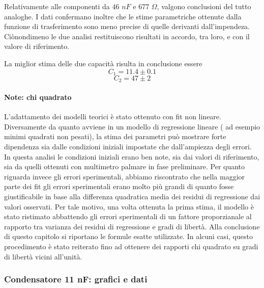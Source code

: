 Relativamente alle componenti da $46$ $nF$ e 677 $\Omega$, valgono conclusioni del tutto analoghe. I dati confermano inoltre che le stime parametriche ottenute dalla funzione di trasferimento sono meno precise di quelle derivanti dall'impendeza. Ciònondimeno le due analisi restituiscono risultati in accordo, tra loro, e con il valore di riferimento.




La miglior stima delle due capacità risulta in conclusione essere
$$
C_{1} = 11.4 \pm 0.1 $$
$$
C_{2} = 47 \pm 2
$$

\paragraph*{Note: chi quadrato}
\label{Note Chi quadrato}

L'adattamento dei modelli teorici è stato ottenuto con fit non lineare. Diversamente da quanto avviene in un modello di regressione lineare ( ad esempio minimi quadrati non pesati), la stima dei parametri può mostrare forte dipendenza sia dalle condizioni iniziali impostate che dall'ampiezza degli errori. In questa analisi le condizioni iniziali erano ben note, sia dai valori di riferimento, sia da quelli ottenuti con multimetro palmare in fase preliminare. Per quanto riguarda invece gli errori sperimentali, abbiamo riscontrato che nella maggior parte dei fit gli errori sperimentali erano molto più grandi di quanto fosse giustificabile in base alla differenza quadratica media dei residui di regressione dai valori osservati. Per tale motivo, una volta ottenuta la prima stima, il modello è stato ristimato abbattendo gli errori sperimentali di un fattore proporzianale al rapporto tra varianza dei residui di regressione e gradi di libertà. Alla conclusione di questo capitolo si riportano le formule esatte utilizzate. In alcuni casi, questo procedimento è stato reiterato fino ad ottenere dei rapporti chi quadrato su gradi di libertà vicini all'unità.



\break
\subsubsection*{Condensatore 11 nF: grafici e dati}

